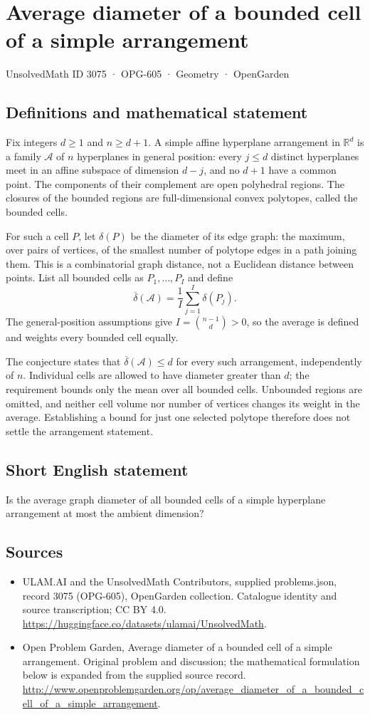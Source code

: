 \documentclass[11pt,a4paper]{article}
\begin{document}
\section*{Average diameter of a bounded cell of a simple arrangement}\label{3075}
{\small UnsolvedMath ID 3075 · OPG-605 · Geometry · OpenGarden}
\subsection{Definitions and mathematical statement}
Fix integers $d\ge1$ and $n\ge d+1$. A simple affine hyperplane
arrangement in $\mathbb R^d$ is a family $\mathcal A$ of $n$ hyperplanes
in general position: every $j\le d$ distinct hyperplanes meet in an
affine subspace of dimension $d-j$, and no $d+1$ have a common point.
The components of their complement are open polyhedral regions.
The closures of the bounded regions are full-dimensional convex polytopes,
called the bounded cells.

For such a cell $P$, let $\delta(P)$ be the diameter of its edge graph:
the maximum, over pairs of vertices, of the smallest number of polytope
edges in a path joining them. This is a combinatorial graph distance,
not a Euclidean distance between points. List all bounded cells as
$P_1,\ldots,P_I$ and define
\[
 \overline\delta(\mathcal A)=\frac1I\sum_{j=1}^I\delta(P_j).
\]
The general-position assumptions give $I=\binom{n-1}{d}>0$, so the
average is defined and weights every bounded cell equally.

The conjecture states that
$\overline\delta(\mathcal A)\le d$ for every such arrangement, independently
of $n$. Individual cells are allowed to have diameter greater than $d$;
the requirement bounds only the mean over all bounded cells.
Unbounded regions are omitted, and neither cell volume nor number of
vertices changes its weight in the average. Establishing a bound for just
one selected polytope therefore does not settle the arrangement statement.
\subsection{Short English statement}
Is the average graph diameter of all bounded cells of a simple hyperplane arrangement at most the ambient dimension?
\subsection{Sources}
\begin{itemize}
\item[S1] ULAM.AI and the UnsolvedMath Contributors, supplied problems.json, record 3075 (OPG-605), OpenGarden collection. Catalogue identity and source transcription; CC BY 4.0.
\url{https://huggingface.co/datasets/ulamai/UnsolvedMath}.
\item[S2] Open Problem Garden, Average diameter of a bounded cell of a simple arrangement. Original problem and discussion; the mathematical formulation below is expanded from the supplied source record.
\url{http://www.openproblemgarden.org/op/average_diameter_of_a_bounded_cell_of_a_simple_arrangement}.
\end{itemize}
\end{document}
